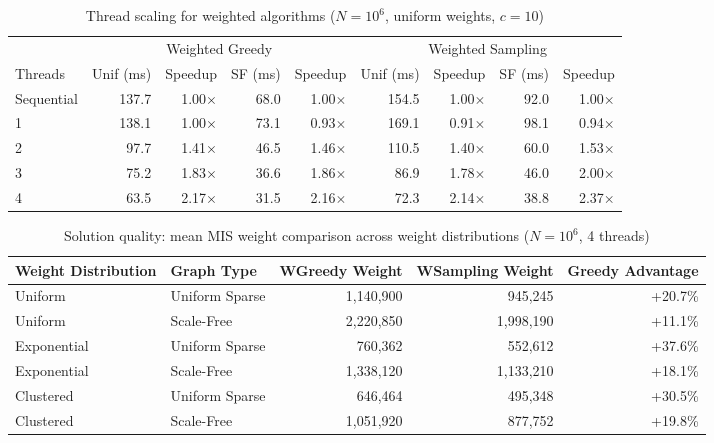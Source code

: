 \documentclass{article}
\begin{document}
\begin{table}[H]
    \centering
    \caption{Thread scaling for weighted algorithms ($N=10^6$, uniform weights, $c=10$)}
    \label{tab:weighted_thread_scaling}
    \small
    \begin{tabular}{l r r r r r r r r}
        \toprule
        & \multicolumn{4}{c}{Weighted Greedy} & \multicolumn{4}{c}{Weighted Sampling} \\
        \cmidrule(lr){2-5} \cmidrule(lr){6-9}
        Threads & Unif (ms) & Speedup & SF (ms) & Speedup & Unif (ms) & Speedup & SF (ms) & Speedup \\
        \midrule
        Sequential & 137.7 & 1.00$\times$ & 68.0 & 1.00$\times$ & 154.5 & 1.00$\times$ & 92.0 & 1.00$\times$ \\
        1          & 138.1 & 1.00$\times$ & 73.1 & 0.93$\times$ & 169.1 & 0.91$\times$ & 98.1 & 0.94$\times$ \\
        2          & 97.7  & 1.41$\times$ & 46.5 & 1.46$\times$ & 110.5 & 1.40$\times$ & 60.0 & 1.53$\times$ \\
        3          & 75.2  & 1.83$\times$ & 36.6 & 1.86$\times$ & 86.9  & 1.78$\times$ & 46.0 & 2.00$\times$ \\
        4          & 63.5  & 2.17$\times$ & 31.5 & 2.16$\times$ & 72.3  & 2.14$\times$ & 38.8 & 2.37$\times$ \\
        \bottomrule
    \end{tabular}
\end{table}

\begin{table}[H]
    \centering
    \caption{Solution quality: mean MIS weight comparison across weight distributions ($N=10^6$, 4 threads)}
    \label{tab:weighted_quality}
    \begin{tabular}{l l r r r}
        \toprule
        Weight Distribution & Graph Type & WGreedy Weight & WSampling Weight & Greedy Advantage \\
        \midrule
        Uniform    & Uniform Sparse & 1{,}140{,}900 & 945{,}245     & +20.7\% \\
        Uniform    & Scale-Free     & 2{,}220{,}850 & 1{,}998{,}190 & +11.1\% \\
        \midrule
        Exponential & Uniform Sparse & 760{,}362    & 552{,}612     & +37.6\% \\
        Exponential & Scale-Free     & 1{,}338{,}120 & 1{,}133{,}210 & +18.1\% \\
        \midrule
        Clustered  & Uniform Sparse & 646{,}464     & 495{,}348     & +30.5\% \\
        Clustered  & Scale-Free     & 1{,}051{,}920 & 877{,}752     & +19.8\% \\
        \bottomrule
    \end{tabular}
\end{table}
\end{document}
